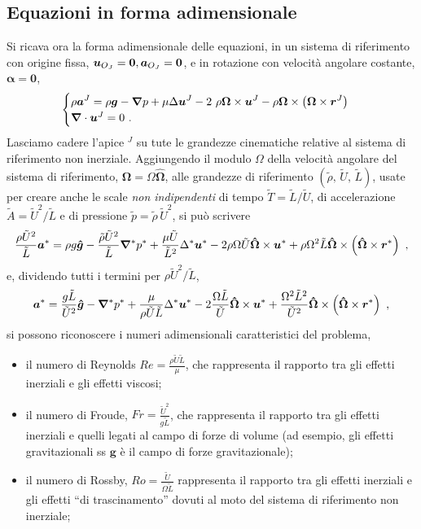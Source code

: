 \subsection{Equazioni in forma adimensionale}
Si ricava ora la forma adimensionale delle equazioni, in un sistema di riferimento con origine fissa, $\bm{u}_{O_J}=\bm{0}, \bm{a}_{O_J} = \bm{0}$, e in rotazione con velocità angolare costante, $\bm{\alpha} = \bm{0}$,
\begin{equation}
\begin{cases}
\begin{aligned}
 \rho \bm{a}^J = \rho \bm{g} - \bm{\nabla} p + \mu \Delta \bm{u}^J 
  - 2~\rho \bm{\Omega} \times \bm{u}^J
  - \rho \bm{\Omega} \times \left( \bm{\Omega} \times \bm{r}^J \right)
\end{aligned} \\
\bm{\nabla} \cdot \bm{u}^J = 0 \ .
\end{cases}
\end{equation}
Lasciamo cadere l'apice $^J$ su tute le grandezze cinematiche relative al sistema di riferimento non inerziale. Aggiungendo il modulo $\Omega$ della velocità angolare del sistema di riferimento, $\bm{\Omega} = \Omega \bm{\hat{\Omega}}$, alle grandezze di riferimento $( \tilde{\rho}, \, \tilde{U}, \, \tilde{L} )$, usate per creare anche le scale \textit{non indipendenti} di tempo $\tilde{T} = \tilde{L}/\tilde{U}$, di accelerazione $\tilde{A} = \tilde{U}^2 / \tilde{L}$ e di pressione $\tilde{p} = \tilde{\rho}\, \tilde{U}^2$, si può scrivere
\begin{equation}
 \dfrac{\rho \tilde{U}^2}{\tilde{L}} \bm{a}^* = \rho g \bm{\hat{g}}
   - \dfrac{\tilde{\rho}\tilde{U}^2}{\tilde{L}} \bm{\nabla}^* p^*
   + \dfrac{\mu \tilde{U}}{\tilde{L}^2} \Delta^* \bm{u}^*
   - 2 \rho \Omega \tilde{U} \bm{\hat{\Omega}} \times \bm{u}^*
   +   \rho \Omega^2 \tilde{L} \bm{\hat{\Omega}} \times \left( \bm{\hat{\Omega}} \times \bm{r}^* \right) \ ,
\end{equation}
e, dividendo tutti i termini per $\rho \tilde{U}^2/\tilde{L}$,
\begin{equation}
 \bm{a}^* = \dfrac{g \tilde{L}}{\tilde{U}^2} \bm{\hat{g}}
   -  \bm{\nabla}^* p^*
   + \dfrac{\mu }{\rho \tilde{U} \tilde{L}} \Delta^* \bm{u}^*
   - 2 \dfrac{\Omega \tilde{L}}{\tilde{U}} \bm{\hat{\Omega}} \times \bm{u}^*
   +   \dfrac{\Omega^2 \tilde{L}^2}{\tilde{U}^2} \bm{\hat{\Omega}} \times \left( \bm{\hat{\Omega}} \times \bm{r}^* \right) \ ,
\end{equation}
si possono riconoscere i numeri adimensionali caratteristici del problema,
\begin{itemize}
 \item il numero di Reynolds $Re = \frac{\rho \tilde{U} \tilde{L}}{\mu}$, che rappresenta il rapporto tra gli effetti inerziali e gli effetti viscosi;
 \item il numero di Froude, $Fr = \frac{\tilde{U}^2}{g \tilde{L}}$, che rappresenta il rapporto tra gli effetti inerziali e quelli legati al campo di forze di volume (ad esempio, gli effetti gravitazionali ss $\bm{g}$ è il campo di forze gravitazionale);
 \item il numero di Rossby, $Ro = \frac{\tilde{U}}{\Omega \tilde{L}}$ rappresenta il rapporto tra gli effetti inerziali e gli effetti ``di trascinamento'' dovuti al moto del sistema di riferimento non inerziale;
\end{itemize}
